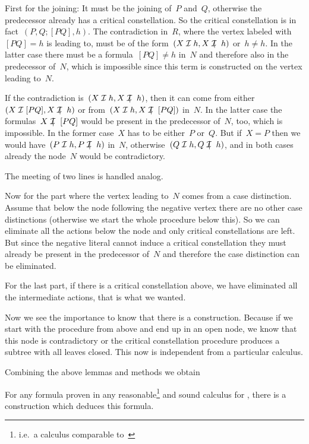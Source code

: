 First for the joining: It must be the joining of~$P$ and~$Q$,
otherwise the predecessor already has a critical constellation. So the
critical constellation is in fact~$(P,Q;[PQ],h)$. The contradiction
in~$R$, where the vertex labeled with~$[PQ]=h$ is leading to, must be
of the form~$(X\cI h, X\notcI h)$ or~$h\not= h$. In the latter case
there must be a formula~$[PQ]\not=h$ in~$N$ and therefore also in
the predecessor of~$N$, which is impossible since this term is
constructed on the vertex leading to~$N$.

If the contradiction is~$(X\cI h, X\notcI h)$, then it can come from
either~$(X\cI [PQ], X\notcI h)$ or from~$(X\cI h, X\notcI [PQ])$
in~$N$. In the latter case the formulas~$X\notcI [PQ]$ would be
present in the predecessor of~$N$, too, which is impossible. In the
former case~$X$ has to be either~$P$ or~$Q$. But if~$X=P$ then we
would have~$(P\cI h, P\notcI h)$ in~$N$, otherwise~$(Q\cI h, Q\notcI
h)$, and in both cases already the node~$N$ would be contradictory.

The meeting of two lines is handled analog.

Now for the part where the vertex leading to~$N$ comes from a case
distinction. Assume that below the node following the negative vertex
there are no other case distinctions (otherwise we start the whole
procedure below this). So we can eliminate all the actions below the
node and only critical constellations are left. But since the negative
literal cannot induce a critical constellation they must already be
present in the predecessor of~$N$ and therefore the case distinction
can be eliminated.

For the last part, if there is a critical constellation above, we have
eliminated all the intermediate actions, that is what we wanted.
\endproof

Now we see the importance to know that there is a construction. Because if we
start with the procedure from above and end up in an open node, we know that
this node is contradictory or the critical constellation procedure produces a
subtree with all leaves closed. This now is independent from a particular
calculus.

Combining the above lemmas and methods we obtain

\begin{theorem}\label{theorem:1}
For any formula proven in any reasonable\footnote{i.e.\ a calculus comparable
to~\pelk} and sound calculus for \pg, there is a construction which deduces
this formula.
\end{theorem}



